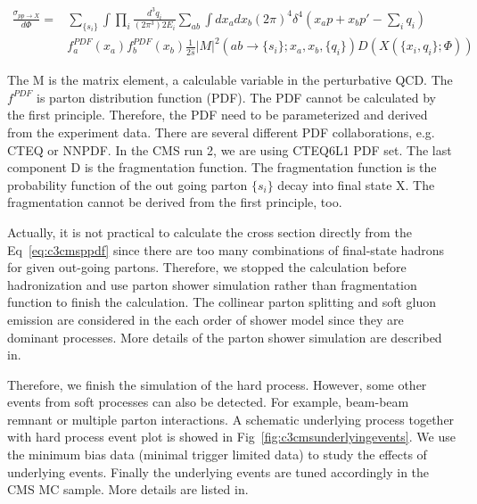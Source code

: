 \begin{equation}
  \begin{split}
		\frac{\sigma_{pp \rightarrow X}}{d\Phi}=& \sum_{\{s_{i}\}} \int \prod_{i} \frac{d^{3}q_{i}}{(2\pi^{3})2E_{i}} \sum_{ab} \int dx_{a}dx_{b}(2\pi)^{4}\delta^{4}(x_{a}p+x_{b}p\prime-\sum_{i}q_{i}) \\
	                                          & f_{a}^{PDF}(x_{a})f_{b}^{PDF}(x_{b}) \frac{1}{2\hat{s}}|M|^{2}(ab \rightarrow \{s_{i}\};x_{a},x_{b},\{q_{i}\}) D(X(\{x_{i},q_{i}\};\Phi))
  \end{split}
 \label{eq:c3cmsppdf}
\end{equation}

The M is the matrix element, a calculable variable in the perturbative QCD. The $f^{PDF}$ is parton distribution function (PDF)\cite{Butterworth:2015oua}. The PDF cannot be calculated by the first principle. Therefore, the PDF need to be parameterized and derived from the experiment data. There are several different PDF collaborations, e.g. CTEQ or NNPDF. In the CMS run 2, we are using CTEQ6L1 PDF set. The last component D is the fragmentation function. The fragmentation function is the probability function of the out going parton $\{s_{i}\}$ decay into final state X. The fragmentation cannot be derived from the first principle, too. 

Actually, it is not practical to calculate the cross section directly from the Eq~\ref{eq:c3cmsppdf} since there are too many combinations of final-state hadrons for given out-going partons. Therefore, we stopped the calculation before hadronization and use parton shower simulation rather than fragmentation function to finish the calculation. The collinear parton splitting and soft gluon emission are considered in the each order of shower model since they are dominant processes. More details of the parton shower simulation are described in\cite{Hoche:2014rga}. 

Therefore, we finish the simulation of the hard process. However, some other events from soft processes can also be detected. For example, beam-beam remnant or multiple parton interactions. A schematic underlying process together with hard process event plot is showed in Fig~\ref{fig:c3cmsunderlyingevents}. We use the minimum bias data (minimal trigger limited data) to study the effects of underlying events. Finally the underlying events are tuned accordingly in the CMS MC sample. More details are listed in\cite{Field:1393621}. 

